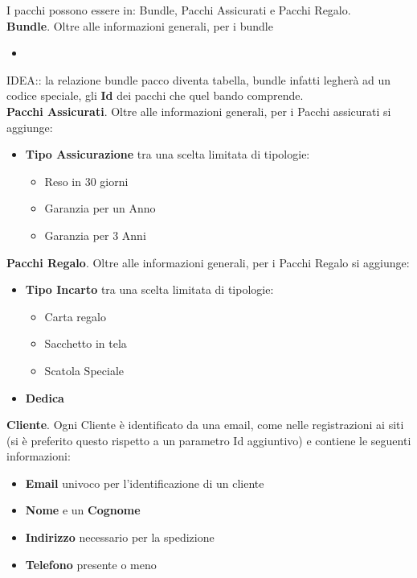 I pacchi possono essere in: Bundle, Pacchi Assicurati e Pacchi Regalo.\\
\textbf{Bundle}. Oltre alle informazioni generali, per i bundle
\begin{itemize}
    \setlength{\itemindent}{+.5in}
    
    \item 
\end{itemize}
IDEA:: la relazione bundle pacco diventa tabella, bundle infatti legherà ad un codice speciale, gli \textbf{Id} dei pacchi che quel bando comprende.\\
\textbf{Pacchi Assicurati}. Oltre alle informazioni generali, per i Pacchi assicurati si aggiunge:
\begin{itemize}
    \setlength{\itemindent}{+.5in}
    \item \textbf{Tipo Assicurazione} tra una scelta limitata di tipologie:
        \begin{itemize}
            \setlength{\itemindent}{+.5in}
            \item Reso in 30 giorni
            \item Garanzia per un Anno
            \item Garanzia per 3 Anni
        \end{itemize}
\end{itemize}

\textbf{Pacchi Regalo}. Oltre alle informazioni generali, per i Pacchi Regalo si aggiunge:
\begin{itemize}
    \setlength{\itemindent}{+.5in}
    \item \textbf{Tipo Incarto} tra una scelta limitata di tipologie:
        \begin{itemize}
            \setlength{\itemindent}{+.5in}
            \item Carta regalo
            \item Sacchetto in tela
            \item Scatola Speciale
        \end{itemize}
    \item \textbf{Dedica}
\end{itemize}

\textbf{Cliente}. Ogni Cliente è identificato da una email, come nelle registrazioni ai siti (si è preferito questo rispetto a un parametro Id aggiuntivo) e contiene le seguenti
informazioni:
\begin{itemize}
    \setlength{\itemindent}{+.5in}
    \item \textbf{Email} univoco per l'identificazione di un cliente
    \item \textbf{Nome} e un \textbf{Cognome}
    \item \textbf{Indirizzo} necessario per la spedizione
    \item \normalsize{\textbf{Telefono}} presente o meno
\end{itemize}

